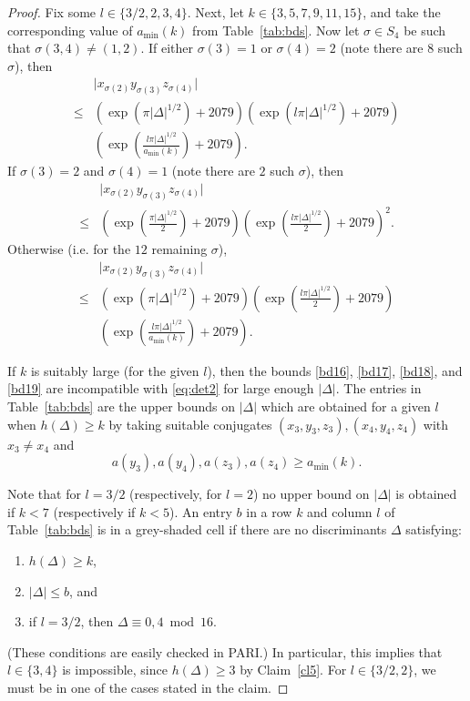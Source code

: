 \documentclass[11pt,a4paper, british]{amsart}
\theoremstyle{definition}
\theoremstyle{remark}
\numberwithin{equation}{section}
\begin{document}
\begin{proof}
Fix some $l \in \{3/2, 2, 3, 4\}$. Next, let $k \in \{3, 5, 7, 9, 11, 15\}$, and take the corresponding value of $a_\mathrm{min}(k)$ from Table~\ref{tab:bds}. Now let $\sigma \in S_4$ be such that $\sigma(3, 4) \neq (1, 2)$. If either $\sigma(3) = 1$ or $\sigma(4) = 2$ (note there are $8$ such $\sigma$), then 
\begin{align}\label{bd17}
	&\lvert x_{\sigma(2)} y_{\sigma(3)} z_{\sigma(4)} \rvert \nonumber \\ 
	\leq &(\exp(\pi \lvert \Delta \rvert^{1/2}) + 2079)(\exp(l \pi \lvert \Delta \rvert^{1/2}) + 2079) \nonumber \\
	&\left(\exp\left(\frac{l \pi \lvert \Delta \rvert^{1/2}}{a_\mathrm{min}(k)}\right) + 2079\right).
\end{align}
If $\sigma(3) = 2$ and $\sigma(4) = 1$ (note there are $2$ such $\sigma$), then 
\begin{align}\label{bd18}
	&\lvert x_{\sigma(2)} y_{\sigma(3)} z_{\sigma(4)} \rvert \nonumber \\
	\leq &\left(\exp\left(\frac{\pi \lvert \Delta \rvert^{1/2}}{2}\right) + 2079\right)\left(\exp\left(\frac{l \pi \lvert \Delta \rvert^{1/2}}{2}\right) + 2079\right)^2.
\end{align}
Otherwise (i.e. for the $12$ remaining $\sigma$),
\begin{align}\label{bd19}
	&\lvert x_{\sigma(2)} y_{\sigma(3)} z_{\sigma(4)} \rvert \nonumber \\
	\leq &(\exp(\pi \lvert \Delta \rvert^{1/2}) + 2079)\left(\exp\left(\frac{l \pi \lvert \Delta \rvert^{1/2}}{2}\right) + 2079\right) \nonumber \\
	&\left(\exp\left(\frac{l \pi \lvert \Delta \rvert^{1/2}}{a_\mathrm{min}(k)}\right) + 2079\right).
\end{align}

If $k$ is suitably large (for the given $l$), then the bounds \eqref{bd16}, \eqref{bd17}, \eqref{bd18}, and \eqref{bd19} are incompatible with \eqref{eq:det2} for large enough $\lvert \Delta \rvert$. The entries in Table~\ref{tab:bds} are the upper bounds on $\lvert \Delta \rvert$ which are obtained for a given $l$ when $h(\Delta) \geq k$ by taking suitable conjugates $(x_3, y_3, z_3), (x_4, y_4, z_4)$ with $x_3 \neq x_4$ and
\[ a(y_3), a(y_4), a(z_3), a(z_4) \geq a_\mathrm{min}(k).\]

Note that for $l = 3/2$ (respectively, for $l=2$) no upper bound on $\lvert \Delta \rvert$ is obtained if $k < 7$ (respectively if $k < 5$). An entry $b$ in a row $k$ and column $l$ of Table~\ref{tab:bds} is in a grey-shaded cell if there are no discriminants $\Delta$ satisfying:
\begin{enumerate}
	\item $h(\Delta) \geq k$,
	\item $\lvert \Delta \rvert \leq b$, and
	\item if $l=3/2$, then $\Delta \equiv 0, 4 \bmod 16$.
\end{enumerate}
(These conditions are easily checked in PARI.) In particular, this implies that $l \in \{3, 4\}$ is impossible, since $h(\Delta) \geq 3$ by Claim~\ref{cl5}. For $l \in \{3/2, 2\}$, we must be in one of the cases stated in the claim.
\end{proof}
\end{document}
